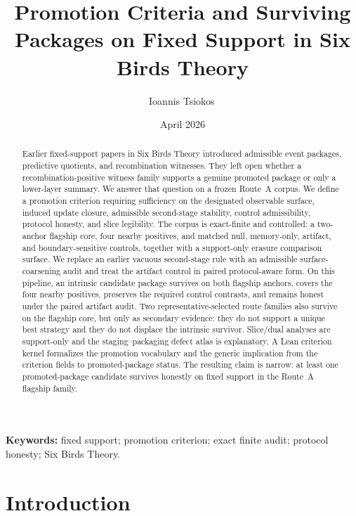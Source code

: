 \documentclass[11pt]{article}
\title{Promotion Criteria and Surviving Packages on Fixed Support in Six Birds Theory}
\author{Ioannis Tsiokos\,\orcidlink{0009-0009-7659-5964}}
\date{April 2026}
\theoremstyle{definition}
\begin{document}
\maketitle
\thispagestyle{firstpage}

\begin{abstract}
Earlier fixed-support papers in Six Birds Theory introduced admissible event packages, predictive quotients, and recombination witnesses. They left open whether a recombination-positive witness family supports a genuine promoted package or only a lower-layer summary. We answer that question on a frozen Route~A corpus. We define a promotion criterion requiring sufficiency on the designated observable surface, induced update closure, admissible second-stage stability, control admissibility, protocol honesty, and slice legibility. The corpus is exact-finite and controlled: a two-anchor flagship core, four nearby positives, and matched null, memory-only, artifact, and boundary-sensitive controls, together with a support-only erasure comparison surface. We replace an earlier vacuous second-stage rule with an admissible surface-coarsening audit and treat the artifact control in paired protocol-aware form. On this pipeline, an intrinsic candidate package survives on both flagship anchors, covers the four nearby positives, preserves the required control contrasts, and remains honest under the paired artifact audit. Two representative-selected route families also survive on the flagship core, but only as secondary evidence: they do not support a unique best strategy and they do not displace the intrinsic survivor. Slice/dual analyses are support-only and the staging--packaging defect atlas is explanatory. A Lean criterion kernel formalizes the promotion vocabulary and the generic implication from the criterion fields to promoted-package status. The resulting claim is narrow: at least one promoted-package candidate survives honestly on fixed support in the Route~A flagship family.
\end{abstract}

\medskip
\noindent\textbf{Keywords:} fixed support; promotion criterion; exact finite audit; protocol honesty; Six Birds Theory.

\section{Introduction}\label{sec:intro}
\end{document}
